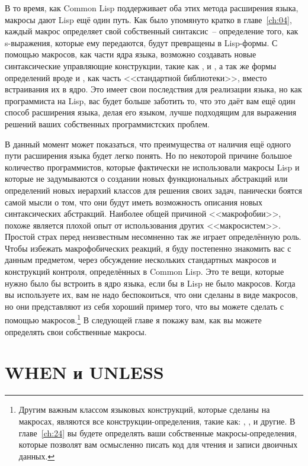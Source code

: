 В то время, как Common Lisp поддерживает оба этих метода расширения языка, макросы дают
Lisp ещё один путь.  Как было упомянуто кратко в главе~\ref{ch:04}, каждый макрос определяет свой
собственный синтаксис~-- определение того, как s-выражения, которые ему передаются, будут
превращены в Lisp-формы. С помощью макросов, как части ядра языка, возможно создавать
новые синтаксические управляющие конструкции, такие как ,  и
, а так же формы определений вроде  и , как
часть <<стандартной библиотеки>>, вместо встраивания их в ядро. Это имеет свои последствия
для реализации языка, но как программиста на Lisp, вас будет больше заботить то, что это
даёт вам ещё один способ расширения языка, делая его языком, лучше подходящим для
выражения решений ваших собственных программистских проблем.

В данный момент может показаться, что преимущества от наличия ещё одного пути расширения
языка будет легко понять. Но по некоторой причине большое количество программистов,
которые фактически не использовали макросы Lisp и которые не задумываются о создании
новых функциональных абстракций или определений новых иерархий классов для решения своих
задач, панически боятся самой мысли о том, что они будут иметь возможность описания новых
синтаксических абстракций. Наиболее общей причиной <<макрофобии>>, похоже является плохой
опыт от использования других <<макросистем>>. Простой страх перед неизвестным несомненно так
же играет определённую роль. Чтобы избежать макрофобических реакций, я буду постепенно
знакомить вас с данным предметом, через обсуждение нескольких стандартных макросов и
конструкций контроля, определённых в Common Lisp. Это те вещи, которые нужно было бы
встроить в ядро языка, если бы в Lisp не было макросов. Когда вы используете их, вам не
надо беспокоиться, что они сделаны в виде макросов, но они представляют из себя хороший
пример того, что вы можете сделать с помощью макросов.\footnote{Другим важным классом
  языковых конструкций, которые сделаны на макросах, являются все конструкции-определения,
  такие как: , ,  и другие. В главе~\ref{ch:24} вы
  будете определять ваши собственные макросы-определения, которые позволят вам осмысленно
  писать код для чтения и записи двоичных данных.} В следующей главе я покажу вам, как вы
можете определять свои собственные макросы.

\section{WHEN и UNLESS}

